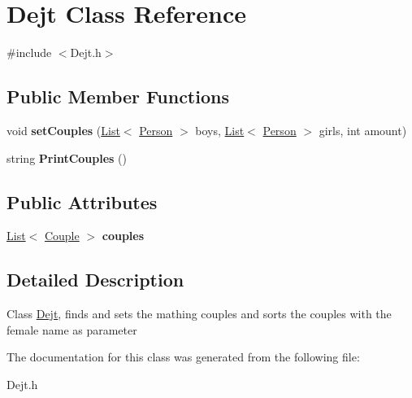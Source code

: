 \hypertarget{class_dejt}{\section{Dejt Class Reference}
\label{class_dejt}
}


{\ttfamily \#include $<$Dejt.\-h$>$}

\subsection*{Public Member Functions}
\begin{DoxyCompactItemize}
\item 
\hypertarget{class_dejt_a7445ca4e80de30d8a1313ec934a059d2}{void {\bfseries set\-Couples} (\hyperlink{class_list}{List}$<$ \hyperlink{class_person}{Person} $>$ boys, \hyperlink{class_list}{List}$<$ \hyperlink{class_person}{Person} $>$ girls, int amount)}\label{class_dejt_a7445ca4e80de30d8a1313ec934a059d2}

\item 
\hypertarget{class_dejt_aaa5436f574f8670f1c807b209757ca57}{string {\bfseries Print\-Couples} ()}\label{class_dejt_aaa5436f574f8670f1c807b209757ca57}

\end{DoxyCompactItemize}
\subsection*{Public Attributes}
\begin{DoxyCompactItemize}
\item 
\hypertarget{class_dejt_acd3e0175948518cb049e260d956992ca}{\hyperlink{class_list}{List}$<$ \hyperlink{class_couple}{Couple} $>$ {\bfseries couples}}\label{class_dejt_acd3e0175948518cb049e260d956992ca}

\end{DoxyCompactItemize}


\subsection{Detailed Description}
Class \hyperlink{class_dejt}{Dejt}, finds and sets the mathing couples and sorts the couples with the female name as parameter 

The documentation for this class was generated from the following file\-:\begin{DoxyCompactItemize}
\item 
Dejt.\-h\end{DoxyCompactItemize}
